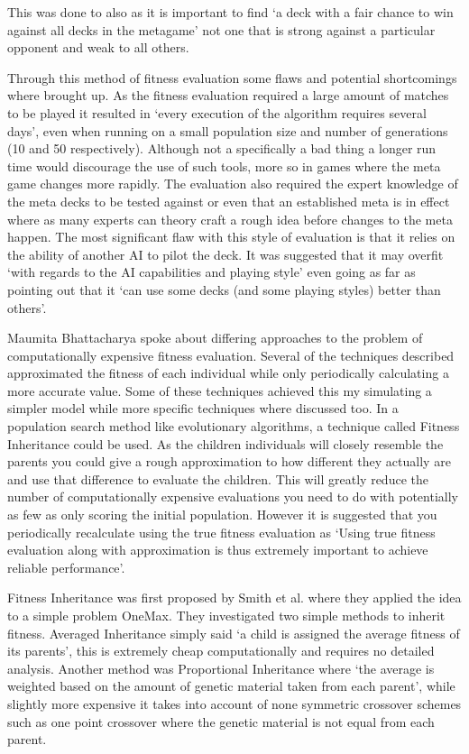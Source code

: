 \documentclass[a4paper]{article}
\begin{document}
This was done to also as it is important to find `a deck with a fair chance to win against all decks in the metagame' not one that is strong against a particular opponent and weak to all others.
\par
Through this method of fitness evaluation some flaws and potential shortcomings where brought up.
As the fitness evaluation required a large amount of matches to be played it resulted in `every execution of the algorithm requires several days', even when running on a small population size and number of generations (10 and 50 respectively).
Although not a specifically a bad thing a longer run time would discourage the use of such tools, more so in games where the meta game changes more rapidly.
The evaluation also required the expert knowledge of the meta decks to be tested against or even that an established meta is in effect where as many experts can theory craft a rough idea before changes to the meta happen.
The most significant flaw with this style of evaluation is that it relies on the ability of another AI to pilot the deck.
It was suggested that it may overfit `with regards to the AI capabilities and playing style' even going as far as pointing out that it `can use some decks (and some playing styles) better than others'.
\\ \par
Maumita Bhattacharya spoke about differing approaches to the problem of computationally expensive fitness evaluation\cite{expensiveOptimisation}.
Several of the techniques described approximated the fitness of each individual while only periodically calculating a more accurate value.
Some of these techniques achieved this my simulating a simpler model while more specific techniques where discussed too.
In a population search method like evolutionary algorithms, a technique called Fitness Inheritance could be used.
As the children individuals will closely resemble the parents you could give a rough approximation to how different they actually are and use that difference to evaluate the children.
This will greatly reduce the number of computationally expensive evaluations you need to do with potentially as few as only scoring the initial population.
However it is suggested that you periodically recalculate using the true fitness evaluation as `Using true fitness evaluation along with approximation is thus extremely important to achieve reliable performance'.
\par
Fitness Inheritance was first proposed by Smith et al.\cite{fitnessInheritance} where they applied the idea to a simple problem OneMax.
They investigated two simple methods to inherit fitness.
Averaged Inheritance simply said `a child is assigned the average fitness of its parents', this is extremely cheap computationally and requires no detailed analysis.
Another method was Proportional Inheritance where `the average is weighted based on the amount of genetic material taken from each parent', while slightly more expensive it takes into account of none symmetric crossover schemes such as one point crossover where the genetic material is not equal from each parent.
\end{document}
